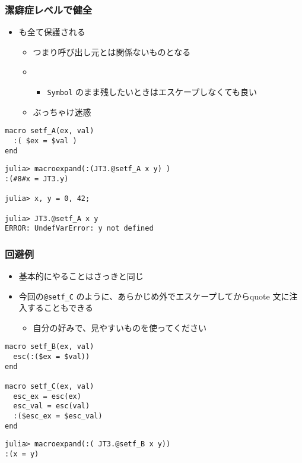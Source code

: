 \begin{frame}[containsverbatim]
\frametitle{潔癖症レベルで健全}
\begin{itemize}
  \item {}も全て保護される
    \begin{itemize}
      \item つまり呼び出し元とは関係ないものとなる
      \item {}
        \begin{itemize}
          \item \verb|Symbol| のまま残したいときはエスケープしなくても良い
        \end{itemize}
      \item ぶっちゃけ迷惑
    \end{itemize}
\end{itemize}
\begin{lstlisting}
macro setf_A(ex, val)
  :( $ex = $val )
end
\end{lstlisting}
\begin{lstlisting}
julia> macroexpand(:(JT3.@setf_A x y) )
:(#8#x = JT3.y)

julia> x, y = 0, 42;

julia> JT3.@setf_A x y
ERROR: UndefVarError: y not defined
\end{lstlisting}
\end{frame}

\begin{frame}[containsverbatim]
\frametitle{回避例}
\begin{itemize}
  \item 基本的にやることはさっきと同じ
  \item 今回の\verb|@setf_C| のように、あらかじめ外でエスケープしてからquote 文に注入することもできる
    \begin{itemize}
      \item 自分の好みで、見やすいものを使ってください
    \end{itemize}
\end{itemize}
\begin{lstlisting}
macro setf_B(ex, val)
  esc(:($ex = $val))
end

macro setf_C(ex, val)
  esc_ex = esc(ex)
  esc_val = esc(val)
  :($esc_ex = $esc_val)
end
\end{lstlisting}
\begin{lstlisting}
julia> macroexpand(:( JT3.@setf_B x y))
:(x = y)
\end{lstlisting}
\end{frame}

